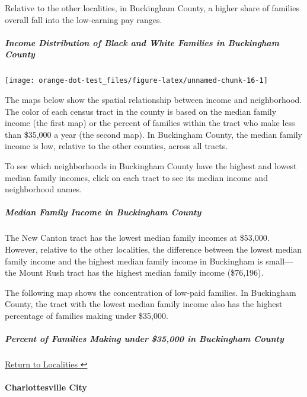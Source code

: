 \documentclass[
]{article}
\begin{document}
Relative to the other localities, in Buckingham County, a higher share
of families overall fall into the low-earning pay ranges.

\hypertarget{income-distribution-of-black-and-white-families-in-buckingham-county}{%
\subparagraph{Income Distribution of Black and White Families in
Buckingham
County}\label{income-distribution-of-black-and-white-families-in-buckingham-county}}

\begin{center}\texttt{[image: orange-dot-test\_files/figure-latex/unnamed-chunk-16-1]} \end{center}

The maps below show the spatial relationship between income and
neighborhood. The color of each census tract in the county is based on
the median family income (the first map) or the percent of families
within the tract who make less than \$35,000 a year (the second map). In
Buckingham County, the median family income is low, relative to the
other counties, across all tracts.

To see which neighborhoods in Buckingham County have the highest and
lowest median family incomes, click on each tract to see its median
income and neighborhood names.

\hypertarget{median-family-income-in-buckingham-county}{%
\subparagraph{Median Family Income in Buckingham
County}\label{median-family-income-in-buckingham-county}}

The New Canton tract has the lowest median family incomes at \$53,000.
However, relative to the other localities, the difference between the
lowest median family income and the highest median family income in
Buckingham is small---the Mount Rush tract has the highest median family
income (\$76,196).

The following map shows the concentration of low-paid families. In
Buckingham County, the tract with the lowest median family income also
has the highest percentage of families making under \$35,000.

\hypertarget{percent-of-families-making-under-35000-in-buckingham-county}{%
\subparagraph{Percent of Families Making under \$35,000 in Buckingham
County}\label{percent-of-families-making-under-35000-in-buckingham-county}}

\protect\hyperlink{localities}{Return to Localities ↩︎}

\hypertarget{charlottesville-city}{%
\paragraph{Charlottesville City}\label{charlottesville-city}}
\end{document}
